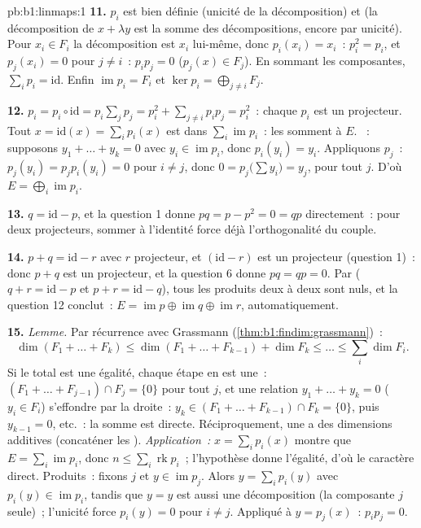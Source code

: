 \begin{solution}{pb:b1:linmaps:1}
\textbf{11.} $p_i$ est bien définie (unicité de la
décomposition) et  (la décomposition de $x + \lambda y$
est la somme des décompositions, encore par unicité). Pour $x_i
\in F_i$ la décomposition est $x_i$ lui-même, donc $p_i(x_i) = x_i$~:
$p_i^2 = p_i$, et $p_j(x_i) = 0$ pour $j \neq i$~: $p_i p_j = 0$
($p_j(x) \in F_j$). En sommant les composantes, $\sum_i p_i =
\mathrm{id}$. Enfin $\operatorname{im} p_i = F_i$ et $\ker
p_i = \bigoplus_{j \neq i} F_j$.

\textbf{12.} $p_i = p_i \circ \mathrm{id} = p_i\sum_j p_j =
p_i^2 + \sum_{j \neq i} p_i p_j = p_i^2$~: chaque $p_i$ est un
projecteur. Tout $x = \mathrm{id}(x) = \sum_i p_i(x)$ est dans
$\sum_i \operatorname{im} p_i$~: les  somment à $E$.
~: supposons $y_1 + \dots + y_k = 0$ avec $y_i \in
\operatorname{im} p_i$, donc $p_i(y_i) = y_i$. Appliquons $p_j$~: $p_j
(y_i) = p_j p_i (y_i) = 0$ pour $i \neq j$, donc $0 = p_j\bigl(\sum
y_i\bigr) = y_j$, pour tout $j$. D'où $E = \bigoplus_i
\operatorname{im} p_i$.

\textbf{13.} $q = \mathrm{id} - p$, et la question 1 donne $pq =
p - p^2 = 0 = qp$ directement~: pour deux projecteurs, sommer à
l'identité force déjà l'orthogonalité du couple.

\textbf{14.} $p + q = \mathrm{id} - r$ avec $r$ projecteur, et
$(\mathrm{id} - r)$ est un projecteur (question 1)~: donc $p + q$ est un
projecteur, et la question 6 donne $pq = qp = 0$. Par  ($q +
r = \mathrm{id} - p$ et $p + r = \mathrm{id} - q$), tous les
produits deux à deux sont nuls, et la question 12 conclut~: $E =
\operatorname{im} p \oplus \operatorname{im} q \oplus
\operatorname{im} r$, automatiquement.

\textbf{15.} \emph{Lemme.} Par récurrence avec Grassmann
(\cref{thm:b1:findim:grassmann})~:
\[
\dim(F_1 + \dots + F_k) \leq \dim(F_1 + \dots + F_{k-1}) + \dim
F_k \leq \dots \leq \sum_i \dim F_i .
\]
Si le total est une égalité, chaque étape en est une~: $(F_1 + \dots +
F_{j-1}) \cap F_j = \{0\}$ pour tout $j$, et une relation $y_1 +
\dots + y_k = 0$ ($y_i \in F_i$) s'effondre par la droite~: $y_k
\in (F_1 + \dots + F_{k-1}) \cap F_k = \{0\}$, puis $y_{k-1} =
0$, etc.~: la somme est directe. Réciproquement, une  a des
dimensions additives (concaténer les ). \emph{Application~:}
$x = \sum_i p_i(x)$ montre que $E = \sum_i \operatorname{im} p_i$,
donc $n \leq \sum_i \operatorname{rk} p_i$~; l'hypothèse donne
l'égalité, d'où le caractère direct. Produits~: fixons $j$ et $y \in
\operatorname{im} p_j$. Alors $y = \sum_i p_i(y)$ avec $p_i(y)
\in \operatorname{im} p_i$, tandis que $y = y$ est aussi une
décomposition (la composante $j$ seule)~; l'unicité force $p_i(y)
= 0$ pour $i \neq j$. Appliqué à $y = p_j(x)$~: $p_i p_j = 0$.


\end{solution}
